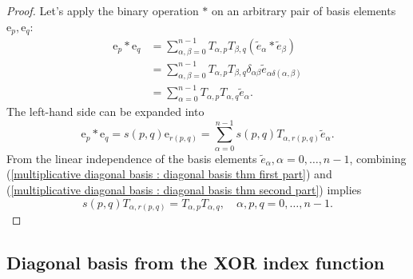 \documentclass{article}
\begin{document}
\begin{proof}
    Let's apply the binary operation $*$ on an arbitrary pair of basis elements $\mathrm e_p, \mathrm e_q$:
    \begin{equation} 
        \label{multiplicative diagonal basis : diagonal basis thm first part}
        \begin{aligned}
            \mathrm e_p * \mathrm e_q &= \sum_{\alpha,\beta=0}^{n-1} T_{\alpha, p} T_{\beta, q} ({\tilde e}_{\alpha} * {\tilde e}_{\beta})\\
            &= \sum_{\alpha,\beta=0}^{n-1} T_{\alpha, p} T_{\beta, q} \delta_{\alpha\beta} {\tilde e}_{\alpha \delta(\alpha,\beta)}\\
            &= \sum_{\alpha=0}^{n-1} T_{\alpha, p} T_{\alpha, q} {\tilde e}_{\alpha}.
        \end{aligned} 
    \end{equation}
    The left-hand side can be expanded into 
    \begin{equation} 
        \label{multiplicative diagonal basis : diagonal basis thm second part}
        \mathrm e_p * \mathrm e_q = s(p,q) \mathrm e_{r(p,q)} = \sum_{\alpha=0}^{n-1} s(p,q) T_{\alpha, r(p,q)} {\tilde e}_{\alpha}.
    \end{equation}
    From the linear independence of the basis elements ${\tilde e}_{\alpha}, \alpha=0,\ldots,n-1$, combining (\ref{multiplicative diagonal basis : diagonal basis thm first part}) and (\ref{multiplicative diagonal basis : diagonal basis thm second part}) implies
    $$ s(p,q) T_{\alpha, r(p,q)} = T_{\alpha, p} T_{\alpha, q}, \quad \alpha,p,q=0,\ldots,n-1. $$
\end{proof}

\subsection{Diagonal basis from the XOR index function}
\label{subsection : diagonal basis for the XOR index function}
\end{document}
